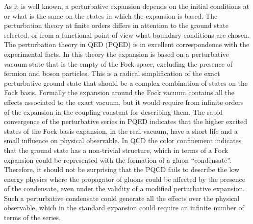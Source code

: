 \documentclass[12pt,letterpaper]{report}
\begin{document}
As it is well known, a perturbative expansion depends on the
initial conditions at \coordHE{} or what is the
same on the states in which the expansion is based. The
perturbation theory at finite orders differs in attention to the
ground state selected, or from a functional point of view what
boundary conditions are chosen. The perturbation theory in QED
(PQED) is in excellent correspondence with the experimental facts.
In this theory the expansion is based on a perturbative vacuum
state that is the empty of the Fock space, excluding the presence
of fermion and boson particles. This is a radical simplification
of the exact perturbative ground state that should be a complex
combination of states on the Fock basis. Formally the expansion
around the Fock vacuum contains all the effects associated to the
exact vacuum, but it would require from infinite orders of the
expansion in the coupling constant for describing them. The rapid
convergence of the perturbative series in PQED indicates that the
higher excited states of the Fock basis expansion, in the real
vacuum, have a short life and a small influence on physical
observable. In QCD the color confinement indicates that the ground
state has a non-trivial structure, which in terms of a Fock
expansion could be represented with the formation of a gluon
``condensate''. Therefore, it should not be surprising that the
PQCD fails to describe the low energy physics where the propagator
of gluons could be affected by the presence of the condensate,
even under the validity of a modified perturbative expansion. Such
a perturbative condensate could generate all the effects over the
physical observable, which in the standard expansion could require
an infinite number of terms of the series.
\end{document}
